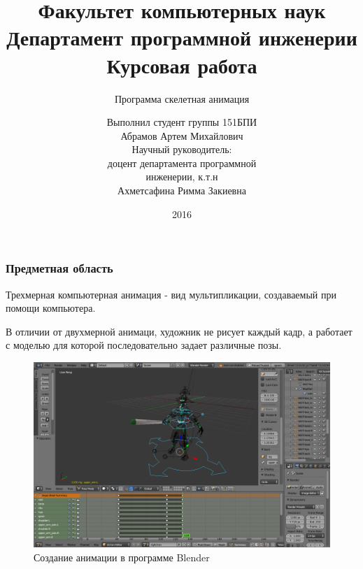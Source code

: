 \documentclass{beamer}
\title[Курсовая работа]{\scriptsize{%
Факультет компьютерных наук \\%
Департамент программной инженерии \\%
Курсовая работа \\%
}}
\subtitle{Программа скелетная анимация}
\author[Абрамов Артем 151 БПИ]{\scriptsize{%
Выполнил студент группы 151БПИ \\%
Абрамов Артем Михайлович \\%
Научный руководитель: \\%
доцент департамента программной \\%
инженерии, к.т.н \\%
Ахметсафина Римма Закиевна}}
\date{2016}
\begin{document}

\frame[plain]{\titlepage}	%




\begin{frame}
\frametitle{Предметная область}
\begin{multicols}{2}
\begin{small}
    Трехмерная компьютерная анимация - вид мультипликации, создаваемый при помощи компьютера. 
    \medskip
    
    В отличии от двухмерной анимаци, художник не рисует каждый кадр, а работает с моделью для которой последовательно задает различные позы.
\end{small}

\columnbreak
    
\begin{figure}[h!]
    \centering
    \includegraphics[width=1.15\columnwidth]{blender_at_work.png}
    \caption{Создание анимации в программе Blender}
\end{figure}

\end{multicols}
\end{frame}
\end{document}
